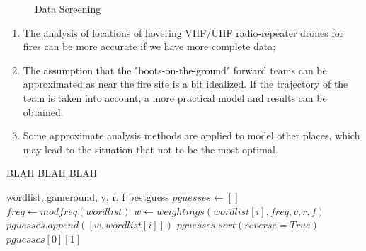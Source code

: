 \documentclass[12pt]{article}  %
\begin{document}
\begin{figure}[htbp]
    \centering    
	\caption{Data Screening} %
\end{figure}

\begin{enumerate}[\bfseries 1.]
    \setlength{\parsep}{0ex} %
    \setlength{\topsep}{0ex} %
    \setlength{\itemsep}{0ex} %
    \item The analysis of locations of hovering VHF/UHF radio-repeater drones for fires can be more accurate if we have more complete data;
    \item The assumption that the "boots-on-the-ground" forward teams can be approximated as near the fire site is a bit idealized. If the trajectory of the team is taken into account, a more practical model and results can be obtained.
    \item Some approximate analysis methods are applied to model other places, which may lead to the situation that not to be the most optimal.
\end{enumerate}

\begin{algorithm}
	\caption{BLAH BLAH BLAH}
	\begin{algorithmic}[1] %
		\REQUIRE wordlist, gameround, v, r, f
		\ENSURE bestguess
		\STATE $pguesses \gets []$
		\STATE $freq \gets modfreq(wordlist)$
		\STATE $w \gets weightings(wordlist[i], freq, v, r, f)$
		\STATE $pguesses.append([w, wordlist[i]])$
		\ENDFOR
		\STATE $pguesses.sort(reverse = True)$
		\RETURN $pguesses[0][1]$
	\end{algorithmic}
\end{algorithm}
\end{document}
